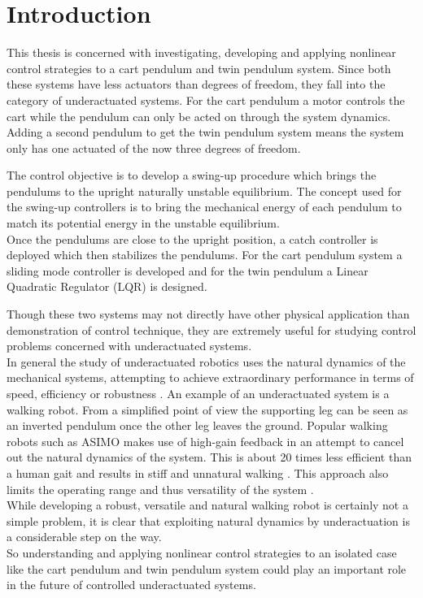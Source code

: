 %
\chapter{Introduction}\label{chap:introduction}
This thesis is concerned with investigating, developing and applying nonlinear control strategies to a cart pendulum and twin pendulum system. Since both these systems have less actuators than degrees of freedom, they fall into the category of underactuated systems. For the cart pendulum a motor controls the cart while the pendulum can only be acted on through the system dynamics. Adding a second pendulum to get the twin pendulum system means the system only has one actuated of the now three degrees of freedom.

The control objective is to develop a swing-up procedure which brings the pendulums to the upright naturally unstable equilibrium. The concept used for the swing-up controllers is to bring the mechanical energy of each pendulum to match its potential energy in the unstable equilibrium.\\
Once the pendulums are close to the upright position, a catch controller is deployed which then stabilizes the pendulums. For the cart pendulum system a sliding mode controller is developed and for the twin pendulum a Linear Quadratic Regulator (LQR) is designed.

Though these two systems may not directly have other physical application than demonstration of control technique, they are extremely useful for studying control problems concerned with underactuated systems.\\
In general the study of underactuated robotics uses the natural dynamics of the mechanical systems, attempting to achieve extraordinary performance in terms of speed, efficiency or robustness \cite{tedrake2009underactuated}.
An example of an underactuated system is a walking robot. From a simplified point of view the supporting leg can be seen as an inverted pendulum once the other leg leaves the ground. Popular walking robots such as ASIMO makes use of high-gain feedback in an attempt to cancel out the natural dynamics of the system. This is about 20 times less efficient than a human gait and results in stiff and unnatural walking \cite{tedrake2009underactuated}. This approach also limits the operating range and thus versatility of the system \cite{tedrake2009underactuated}.\\
While developing a robust, versatile and natural walking robot is certainly not a simple problem, it is clear that exploiting natural dynamics by underactuation is a considerable step on the way.\\
So understanding and applying nonlinear control strategies to an isolated case like the cart pendulum and twin pendulum system could play an important role in the future of controlled underactuated systems.